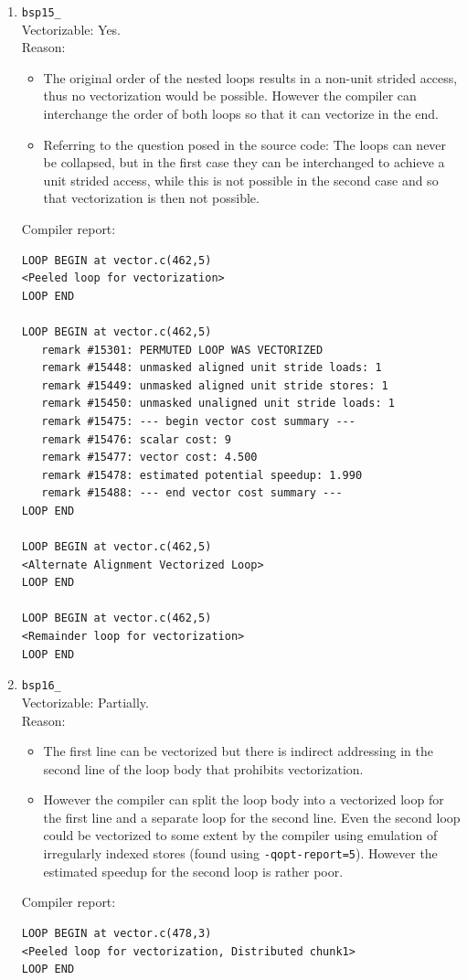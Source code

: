 \documentclass[11pt]{article}
\begin{document}
\begin{enumerate}
\item \texttt{bsp15\_}\\
Vectorizable: Yes.\\
Reason:
\begin{itemize}
\item The original order of the nested loops results in a non-unit strided access, thus no vectorization would be possible. However the compiler can interchange the order of both loops so that it can vectorize in the end.
\item Referring to the question posed in the source code: The loops can never be collapsed, but in the first case they can be interchanged to achieve a unit strided access, while this is not possible in the second case and so that vectorization is then not possible.
\end{itemize}
Compiler report:
\begin{lstlisting}
LOOP BEGIN at vector.c(462,5)
<Peeled loop for vectorization>
LOOP END

LOOP BEGIN at vector.c(462,5)
   remark #15301: PERMUTED LOOP WAS VECTORIZED
   remark #15448: unmasked aligned unit stride loads: 1 
   remark #15449: unmasked aligned unit stride stores: 1 
   remark #15450: unmasked unaligned unit stride loads: 1 
   remark #15475: --- begin vector cost summary ---
   remark #15476: scalar cost: 9 
   remark #15477: vector cost: 4.500 
   remark #15478: estimated potential speedup: 1.990 
   remark #15488: --- end vector cost summary ---
LOOP END

LOOP BEGIN at vector.c(462,5)
<Alternate Alignment Vectorized Loop>
LOOP END

LOOP BEGIN at vector.c(462,5)
<Remainder loop for vectorization>
LOOP END
\end{lstlisting}

\item \texttt{bsp16\_}\\
Vectorizable: Partially.\\
Reason:
\begin{itemize}
\item The first line can be vectorized but there is indirect addressing in the second line of the loop body that prohibits vectorization.
\item However the compiler can split the loop body into a vectorized loop for the first line and a separate loop for the second line. Even the second loop could be vectorized to some extent by the compiler using emulation of irregularly indexed stores (found using \texttt{-qopt-report=5}). However the estimated speedup for the second loop is rather poor.
\end{itemize}
Compiler report:
\begin{lstlisting}
LOOP BEGIN at vector.c(478,3)
<Peeled loop for vectorization, Distributed chunk1>
LOOP END


\end{lstlisting}
\end{enumerate}
\end{document}
